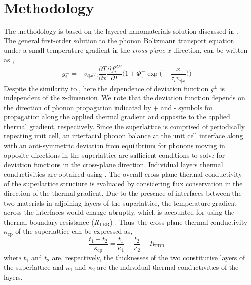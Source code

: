 \section{Methodology}
The methodology is based on the layered nanomaterials solution discussed in . The general first-order solution to the phonon Boltzmann transport equation under a small temperature gradient in the \textit{cross-plane} $x$ direction, can be written as \cite{ownSLXP},
\begin{equation} 
  g_i^\pm=  -v_{i|x} \tau_{i}\frac{\partial T}{\partial x}\frac{\partial f_{i}^{BE}}{\partial T}\Bigg(1+\Phi_{i}^\pm\exp\Big(-\dfrac{x}{\tau_{i} v_{i|x}}\Big) \Bigg)
\label{eq:ch6-gpm}
\end{equation}
Despite the similarity to , here the dependence of deviation function $g^\pm$ is independent of the z-dimension. We note that the deviation function depends on the direction of phonon propagation indicated by + and - symbols for propagation along the applied thermal gradient and opposite to the applied thermal gradient, respectively. Since the superlattice is comprised of periodically repeating unit cell, an interfacial phonon balance at the unit cell interface \cite{RN396} along with an anti-symmetric deviation from equilibrium for phonons moving in opposite directions in the superlattice \cite{RN582} are sufficient conditions to solve for deviation functions in the cross-plane direction. Individual layers thermal conductivities are obtained using . The overall cross-plane thermal conductivity of the superlattice structure is evaluated by considering flux conservation in the direction of the thermal gradient. Due to the presence of interfaces between the two materials in adjoining layers of the superlattice, the temperature gradient across the interfaces would change abruptly, which is accounted for using the thermal boundary resistance ($R_\textrm{TBR}$) \cite{RN328}. Thus, the cross-plane thermal conductivity $\kappa_\textrm{cp}$ of the superlattice can be expressed as,
\begin{equation} 
\dfrac{t_1+t_2}{\kappa_\textrm{cp}}=\dfrac{t_1}{\kappa_1}+\dfrac{t_2}{\kappa_2}+R_\textrm{TBR}
\end{equation}
where $t_1$ and $t_2$ are, respectively, the thicknesses of the two constitutive layers of the superlattice and $\kappa_1$ and $\kappa_2$ are the individual thermal conductivities of the layers.
